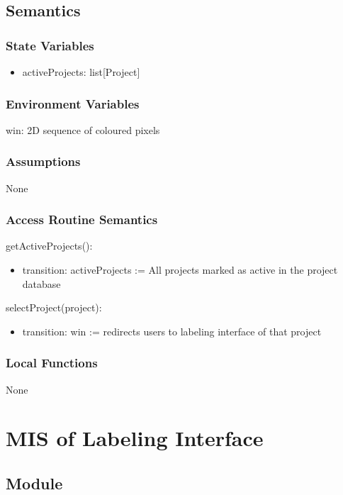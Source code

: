 \documentclass[12pt, titlepage]{article}
\begin{document}
\subsection{Semantics}

\subsubsection{State Variables}
\begin{itemize}
    \item activeProjects: list[Project] 
\end{itemize}

\subsubsection{Environment Variables}
win: 2D sequence of coloured pixels

\subsubsection{Assumptions}
None

\subsubsection{Access Routine Semantics}

\noindent getActiveProjects():
\begin{itemize}
\item transition: activeProjects := All projects marked as active in the project database
\end{itemize}

\noindent selectProject(project):
\begin{itemize}
\item transition: win := redirects users to labeling interface of that project
\end{itemize}

\subsubsection{Local Functions}
None

\section{MIS of Labeling Interface} \label{li}

\subsection{Module}
\end{document}
